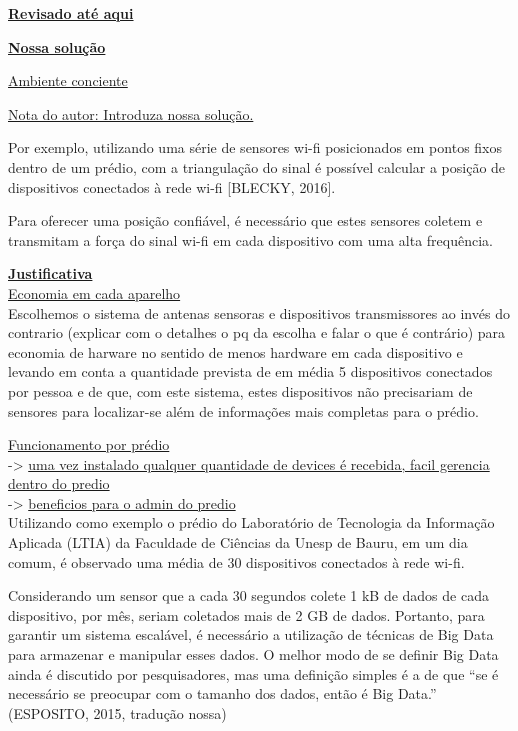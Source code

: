 \documentclass[
	12pt,				%
	openright,			%
	oneside,			%
	a4paper,			%
	chapter=TITLE,		%
	english,			%
	french,				%
	spanish,			%
	brazil				%
	]{abntex2}
\begin{document}
{\textbf{\underline{Revisado até aqui}}

\textbf{\underline{Nossa solução}}

\underline{Ambiente conciente}

\underline{Nota do autor: Introduza nossa solução.}



Por exemplo, utilizando uma série de sensores wi-fi posicionados em pontos
fixos dentro de um prédio, com a triangulação do sinal é possível calcular a posição
de dispositivos conectados à rede wi-fi [BLECKY, 2016].



Para oferecer uma posição confiável, é necessário que estes sensores
coletem e transmitam a força do sinal wi-fi em cada dispositivo com uma alta
frequência.


\textbf{\underline{Justificativa }}\\


\underline{Economia em cada aparelho}\\

Escolhemos o sistema de antenas sensoras e dispositivos transmissores ao invés
do contrario (explicar com o detalhes o pq da escolha e falar o que é contrário)
para economia de harware no sentido de menos hardware em cada dispositivo e
levando em conta  a quantidade prevista de em média 5 dispositivos conectados
por pessoa e de que, com este sistema, estes dispositivos não precisariam de
sensores para localizar-se além de informações mais completas para o prédio.

\underline{Funcionamento por prédio} \\
 -> \underline{uma vez instalado qualquer quantidade de
devices é recebida, facil gerencia dentro do predio}\\
 -> \underline {beneficios para o admin do predio}\\


Utilizando como exemplo o prédio do Laboratório de Tecnologia da
Informação Aplicada (LTIA) da Faculdade de Ciências da Unesp de Bauru, em um dia
comum, é observado uma média de 30 dispositivos conectados à rede wi-fi.

Considerando um sensor que a cada 30 segundos colete 1 kB de dados de cada
dispositivo, por mês, seriam coletados mais de 2 GB de dados. Portanto, para garantir
um sistema escalável, é necessário a utilização de técnicas de Big Data para
armazenar e manipular esses dados.
O melhor modo de se definir Big Data ainda é discutido por pesquisadores,
mas uma definição simples é a de que “se é necessário se preocupar com o tamanho
dos dados, então é Big Data.” (ESPOSITO, 2015, tradução nossa)


}
\end{document}
